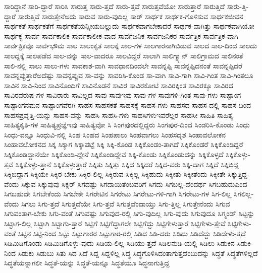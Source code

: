 {ಸಾರಿದ್ದಾನೆ
ಸಾರಿ-ದ್ದಾರೆ
ಸಾರಿಸಿ
ಸಾರುತ್ತ
ಸಾರು-ತ್ತದೆ
ಸಾರು-ತ್ತವೆ
ಸಾರುತ್ತವೆಯೋ
ಸಾರುತ್ತಾರೆ
ಸಾರುತ್ತಿದೆ
ಸಾರು-ತ್ತಿ-ದ್ದಾರೆ
ಸಾರುತ್ತಿವೆ
ಸಾರುತ್ತೇನೆಅದು
ಸಾರುವ
ಸಾರು-ವುದಿಲ್ಲ
ಸಾರ್
ಸಾರ್ಥಕ
ಸಾರ್ಥಕ-ಗೊಳಿಸುವ
ಸಾರ್ಥಕಜೀವನ
ಸಾರ್ಥಕತೆ
ಸಾರ್ಥಕತೆಗೆ
ಸಾರ್ಥಕತೆಯನ್ನೀಯಬಲ್ಲುದು
ಸಾರ್ಥಕವಾಗಬೇಕಾದರೆ
ಸಾರ್ಥಕ-ವಾಗಿತ್ತು
ಸಾರ್ಥಕವಾಗಿಯೋ
ಸಾರ್ಥಕ್ಯ
ಸಾರ್ವ
ಸಾರ್ವಕಾಲಿಕ
ಸಾರ್ವಕಾಲೀಕ-ವಾದ
ಸಾರ್ವಜನಿಕ
ಸಾರ್ವಜನಿಕರ
ಸಾರ್ವತ್ರಿಕ
ಸಾರ್ವತ್ರಿಕ-ವಾಗಿ
ಸಾರ್ವತ್ರಿಕವೂ
ಸಾರ್ವಭೌಮ
ಸಾಲ
ಸಾಲಂಕೃತ
ಸಾಲಕ್ಕೆ
ಸಾಲ-ಗಳ
ಸಾಲಗಾರನಾಗಿಬಿಡುವ
ಸಾಲದ
ಸಾಲ-ದಿಂದ
ಸಾಲದು
ಸಾಲದ್ದಕ್ಕೆ
ಸಾಲಪಡೆದ
ಸಾಲ-ವನ್ನು
ಸಾಲ-ವಾದರೂ
ಸಾಲವಿದ್ದರೆ
ಸಾಲಾಗಿ
ಸಾಲಿಗ್ಮ್ಯಾನ್
ಸಾಲಿಗ್ರಾಮದ
ಸಾಲಿನಂತೆ
ಸಾಲಿ-ನಲ್ಲಿ
ಸಾಲು
ಸಾಲು-ಗಳು
ಸಾವಕಾಶ-ವಾಗಿ
ಸಾವಧಾನದಿಂದಲೇ
ಸಾವನ್ನಪ್ಪಿ
ಸಾವನ್ನಪ್ಪಿದನಂತೆ
ಸಾವನ್ನಪ್ಪಿದರೆ
ಸಾವನ್ನಪ್ಪುತ್ತಾರೆಅದೆಷ್ಟು
ಸಾವನ್ನಪ್ಪುವ
ಸಾ-ವನ್ನು
ಸಾವರಿಸಿ-ಕೊಂಡ
ಸಾ-ವಾಗಿ
ಸಾವಿ-ಗಾಗಿ
ಸಾವಿ-ಗಿಂತ
ಸಾವಿ-ಗಿಂತಲೂ
ಸಾವಿನ
ಸಾವಿ-ನಿಂದ
ಸಾವಿನೊಂದಿಗೆ
ಸಾವಿನೊಡನೆ
ಸಾವಿರ
ಸಾವಿರಕೋಟಿ
ಸಾವಿರಕ್ಕಿಂತ
ಸಾವಿರಕ್ಕೂ
ಸಾವಿರದ
ಸಾವಿರವರುಷ-ಗಳ
ಸಾವಿರಾರು
ಸಾವಿಲ್ಲದ
ಸಾವು
ಸಾವುಇವು
ಸಾವು-ಗಳ
ಸಾವುಗಳಿ-ಗಿಂತ
ಸಾವು-ಗಳು
ಸಾಷ್ಟಾಂಗ
ಸಾಷ್ಟಾಂಗನಮನ
ಸಾಷ್ಟಾಂಗವೆರಗಿ
ಸಾಹಸ
ಸಾಹಸಕತೆ
ಸಾಹಸಕ್ಕೆ
ಸಾಹಸ-ಗಳು
ಸಾಹಸದ
ಸಾಹಸ-ದಲ್ಲಿ
ಸಾಹಸ-ದಿಂದ
ಸಾಹಸಪ್ರವೃತ್ತಿ-ಯನ್ನು
ಸಾಹಸ-ವನ್ನು
ಸಾಹಸಿ
ಸಾಹಸಿ-ಗಳು
ಸಾಹಸಿಗಳುಇವರೆಲ್ಲರ
ಸಾಹಸೀ
ಸಾಹಿತಿ
ಸಾಹಿತ್ಯ
ಸಾಹಿತ್ಯಕೃತಿ-ಗಳ
ಸಾಹಿತ್ಯಪ್ರಜ್ಞೆಇವು
ಸಾಹಿತ್ಯವೋ
ಸಿ
ಸಿಂಗಪುರದಲ್ಲಿದ್ದರು
ಸಿಂಗಪುರ-ದಿಂದ
ಸಿಂಡರಿಸಿ-ಕೊಂಡು
ಸಿಂಧು
ಸಿಂಧು-ವನ್ನೂ
ಸಿಂಧುವಿ-ನಲ್ಲಿ
ಸಿಂಹ
ಸಿಂಹದ
ಸಿಂಹಪಾಲು
ಸಿಂಹವಾಗಲು
ಸಿಂಹಸದೃಶ
ಸಿಂಹಾವಲೋಕನ
ಸಿಂಹಾವಲೋಕನದ
ಸಿಕ್ಕ
ಸಿಕ್ಕಾಗ
ಸಿಕ್ಕಾಪಟ್ಟೆ
ಸಿಕ್ಕಿ
ಸಿಕ್ಕಿ-ಕೊಂಡ
ಸಿಕ್ಕಿಕೊಂಡಂ-ತಾಗಿದೆ
ಸಿಕ್ಕಿಕೊಂಡರೆ
ಸಿಕ್ಕಿಕೊಂಡಿದ್ದರೆ
ಸಿಕ್ಕಿಕೊಂಡಿದ್ದಾನೆಯೇ
ಸಿಕ್ಕಿಕೊಂಡಿ-ದ್ದೇನೆ
ಸಿಕ್ಕಿಕೊಂಡಿದ್ದೇವೆ
ಸಿಕ್ಕಿ-ಕೊಂಡು
ಸಿಕ್ಕಿಕೊಂಡುದನ್ನು
ಸಿಕ್ಕಿಕೊಳ್ಳದೆ
ಸಿಕ್ಕಿಕೊಳ್ಳು-ತ್ತವೆ
ಸಿಕ್ಕಿಕೊಳ್ಳು-ತ್ತಾನೆ
ಸಿಕ್ಕಿಕೊಳ್ಳುತ್ತಾರೆ
ಸಿಕ್ಕಿತು
ಸಿಕ್ಕಿತ್ತು
ಸಿಕ್ಕಿದ
ಸಿಕ್ಕಿದರೆ
ಸಿಕ್ಕಿದ-ವರು
ಸಿಕ್ಕಿ-ದಾಗ
ಸಿಕ್ಕಿದೆ
ಸಿಕ್ಕಿಬಿದ್ದ
ಸಿಕ್ಕಿಬಿದ್ದಾಗ
ಸಿಕ್ಕಿಯೇ
ಸಿಕ್ಕಿರ-ಬೇಕು
ಸಿಕ್ಕಿರ-ಲಿಲ್ಲ
ಸಿಕ್ಕಿರುವ
ಸಿಕ್ಕಿಲ್ಲ
ಸಿಕ್ಕಿಹುದು
ಸಿಕ್ಕೀತು
ಸಿಕ್ಕೀತೆಂದು
ಸಿಕ್ಕೀತೇ
ಸಿಕ್ಕುತ್ತಿದ್ದ-ವೆಂದು
ಸಿಕ್ಕುವ
ಸಿಕ್ಕುವುವು
ಸಿಕ್ಸರ್
ಸಿಗದಷ್ಟು
ಸಿಗದಾಯಿತೆಂಬವರಿಗೆ
ಸಿಗದು
ಸಿಗಬಲ್ಲ-ದೆಂದರ್ಥ
ಸಿಗಬಹುದುಎಂದ
ಸಿಗಬಹುದೇ
ಸಿಗಬೇಕೆಂದು
ಸಿಗಬೇಕೇ
ಸಿಗರೇಟಿನ
ಸಿಗರೇಟು
ಸಿಗರೇಟು-ಗಳಿ-ಗಾಗಿ
ಸಿಗರೇಟು-ಗಳ
ಸಿಗ-ಲಿಲ್ಲ
ಸಿಗಲಿಲ್ಲ-ವೆಂದು
ಸಿಗಲು
ಸಿಗು-ತ್ತದೆ
ಸಿಗುತ್ತದೆಯೇ
ಸಿಗು-ತ್ತವೆ
ಸಿಗುತ್ತವೆಂದಾಯ್ತು
ಸಿಗು-ತ್ತಿಲ್ಲ
ಸಿಗುತ್ತೇನೆಂದು
ಸಿಗುವ
ಸಿಗುವಂತಾಗ-ಬೇಕು
ಸಿಗು-ವಂತೆ
ಸಿಗುವಷ್ಟು
ಸಿಗುವುದ-ರಲ್ಲಿ
ಸಿಗು-ವುದಿಲ್ಲ
ಸಿಗು-ವುದು
ಸಿಗುವುದೂ
ಸಿಗ್ಮಂಡ್
ಸಿಟ್ಟನ್ನು
ಸಿಟ್ಟಾಗ-ಲಿಲ್ಲ
ಸಿಟ್ಟಾಗಿ
ಸಿಟ್ಟಾಗು-ತ್ತಾರೆ
ಸಿಟ್ಟಿಗೆ
ಸಿಟ್ಟಿಗೆದ್ದಾಗಲೇ
ಸಿಟ್ಟಿಗೆದ್ದು
ಸಿಟ್ಟಿಗೇಳುತ್ತಾರೆ
ಸಿಟ್ಟಿಗೇಳು-ತ್ತೇವೆ
ಸಿಟ್ಟಿಗೇಳು-ವಂತೆ
ಸಿಟ್ಟಿನ
ಸಿಟ್ಟಿ-ನಿಂದ
ಸಿಟ್ಟು
ಸಿಟ್ಟುಗಾರರ
ಸಿಟ್ಟುಗಾರ-ರಲ್ಲಿ
ಸಿಡಿದ
ಸಿಡಿ-ದರು
ಸಿಡಿದು
ಸಿಡಿದೆದ್ದು
ಸಿಡಿದೇಳು-ತ್ತದೆ
ಸಿಡಿಮಿಡಿಗೊಂಡು
ಸಿಡಿಮಿಡಿಗೊಳ್ಳು-ವುದು
ಸಿಡಿಯ-ಲಿಲ್ಲ
ಸಿಡಿಯು-ತ್ತದೆ
ಸಿಡಿಲನುಡಿ-ಯಲ್ಲಿ
ಸಿಡಿಲು
ಸಿಡುಕಿನ
ಸಿಡುಕಿ-ನಿಂದ
ಸಿಡುಕು
ಸಿಡುಬು
ಸಿತು
ಸಿದ
ಸಿದೆ
ಸಿದ್ದ
ಸಿದ್ದಳಿಲ್ಲ
ಸಿದ್ಧ
ಸಿದ್ಧಗೊಳಿಸಿದಂತಾಗುತ್ತದೆಂಬುದನ್ನು
ಸಿದ್ಧತೆ
ಸಿದ್ಧತೆಗಳಿಲ್ಲದೆ
ಸಿದ್ಧತೆಯನ್ನಾಗಲೀ
ಸಿದ್ಧತೆ-ಯನ್ನು
ಸಿದ್ಧತೆ-ಯನ್ನೂ
ಸಿದ್ಧತೆಯೂ
ಸಿದ್ಧನಾಗುತ್ತಿದ್ದ
}
